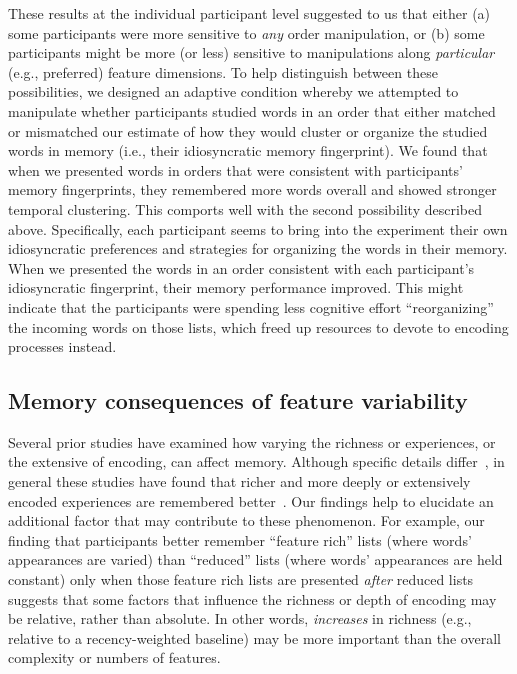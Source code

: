 \documentclass[11pt]{article}
\begin{document}
These results at the individual participant level suggested to us that either
(a) some participants were more sensitive to \textit{any} order manipulation,
or (b) some participants might be more (or less) sensitive to manipulations
along \textit{particular} (e.g., preferred) feature dimensions. To help
distinguish between these possibilities, we designed an adaptive condition
whereby we attempted to manipulate whether participants studied words in an
order that either matched or mismatched our estimate of how they would cluster
or organize the studied words in memory (i.e., their idiosyncratic memory
fingerprint). We found that when we presented words in orders that were
consistent with participants' memory fingerprints, they remembered more words
overall and showed stronger temporal clustering. This comports well with the
second possibility described above. Specifically, each participant seems to
bring into the experiment their own idiosyncratic preferences and strategies
for organizing the words in their memory. When we presented the words in an
order consistent with each participant's idiosyncratic fingerprint, their
memory performance improved. This might indicate that the participants were
spending less cognitive effort ``reorganizing'' the incoming words on those
lists, which freed up resources to devote to encoding processes instead.


\subsection*{Memory consequences of feature variability}

Several prior studies have examined how varying the richness or experiences, or
the extensive of encoding, can affect memory. Although specific details
differ~\citep{BoniEtal22}, in general these studies have found that richer and
more deeply or extensively encoded experiences are remembered
better~\citep{HargEtal12, Mada21, MeinEtal20}. Our findings help to elucidate
an additional factor that may contribute to these phenomenon. For example, our
finding that participants better remember ``feature rich'' lists (where words'
appearances are varied) than ``reduced'' lists (where words' appearances are
held constant) only when those feature rich lists are presented \textit{after}
reduced lists suggests that some factors that influence the richness or depth
of encoding may be relative, rather than absolute. In other words,
\textit{increases} in richness (e.g., relative to a recency-weighted baseline)
may be more important than the overall complexity or numbers of features.
\end{document}
